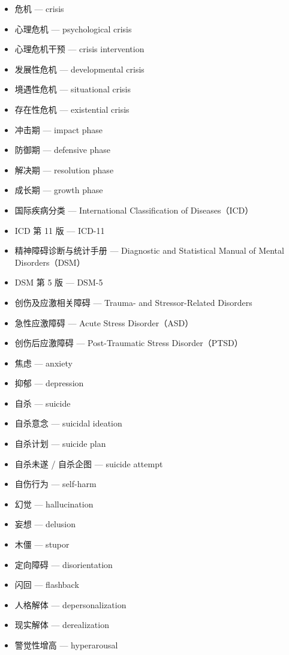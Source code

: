\documentclass[
  chinese,
  9pt,
  a4paper,
]{ctexart}
\providecommand{\tightlist}{%
  \setlength{\itemsep}{0pt}\setlength{\parskip}{0pt}}
\begin{document}
\begin{itemize}
\tightlist
\item
  危机 --- crisis
\item
  心理危机 --- psychological crisis
\item
  心理危机干预 --- crisis intervention
\item
  发展性危机 --- developmental crisis
\item
  境遇性危机 --- situational crisis
\item
  存在性危机 --- existential crisis
\item
  冲击期 --- impact phase
\item
  防御期 --- defensive phase
\item
  解决期 --- resolution phase
\item
  成长期 --- growth phase
\item
  国际疾病分类 --- International Classification of Diseases（ICD）
\item
  ICD 第 11 版 --- ICD-11
\item
  精神障碍诊断与统计手册 --- Diagnostic and Statistical Manual of Mental
  Disorders（DSM）
\item
  DSM 第 5 版 --- DSM-5
\item
  创伤及应激相关障碍 --- Trauma- and Stressor-Related Disorders
\item
  急性应激障碍 --- Acute Stress Disorder（ASD）
\item
  创伤后应激障碍 --- Post-Traumatic Stress Disorder（PTSD）
\item
  焦虑 --- anxiety
\item
  抑郁 --- depression
\item
  自杀 --- suicide
\item
  自杀意念 --- suicidal ideation
\item
  自杀计划 --- suicide plan
\item
  自杀未遂 / 自杀企图 --- suicide attempt
\item
  自伤行为 --- self-harm
\item
  幻觉 --- hallucination
\item
  妄想 --- delusion
\item
  木僵 --- stupor
\item
  定向障碍 --- disorientation
\item
  闪回 --- flashback
\item
  人格解体 --- depersonalization
\item
  现实解体 --- derealization
\item
  警觉性增高 --- hyperarousal

\end{itemize}
\end{document}
